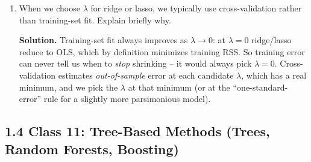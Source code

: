 \documentclass[11pt]{article}
\newcommand{\solution}[1]{%
  \par\medskip\noindent\textbf{Solution.} #1\par\medskip
}
\begin{document}
\begin{enumerate}[leftmargin=*, resume]
\solution{The penalty applies the same $\lambda$ to every coefficient, but the magnitude of a coefficient depends on the scale of its predictor. A variable measured in dollars will have a tiny coefficient (so a small penalty contribution) compared to one measured in counts -- purely because of units, not because of importance. Without standardization, the choice of measurement units silently determines which variables get shrunk most. Standardizing each predictor to mean zero and unit variance makes the penalty comparable across variables.}

\item When we choose $\lambda$ for ridge or lasso, we typically use cross-validation rather than training-set fit. Explain briefly why.

\solution{Training-set fit always improves as $\lambda \to 0$: at $\lambda = 0$ ridge/lasso reduce to OLS, which by definition minimizes training RSS. So training error can never tell us when to \emph{stop} shrinking -- it would always pick $\lambda = 0$. Cross-validation estimates \emph{out-of-sample} error at each candidate $\lambda$, which has a real minimum, and we pick the $\lambda$ at that minimum (or at the ``one-standard-error'' rule for a slightly more parsimonious model).}

\end{enumerate}


\subsection*{1.4 Class 11: Tree-Based Methods (Trees, Random Forests, Boosting)}
\end{document}
